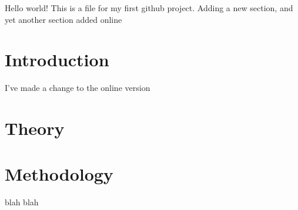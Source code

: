 \documentclass{article}
\begin{document}
Hello world! This is a file for my first github project. Adding a new section, and yet another section added online
\section{Introduction}

I've made a change to the online version

\section{Theory}
\section{Methodology}

blah blah
\end{document}
